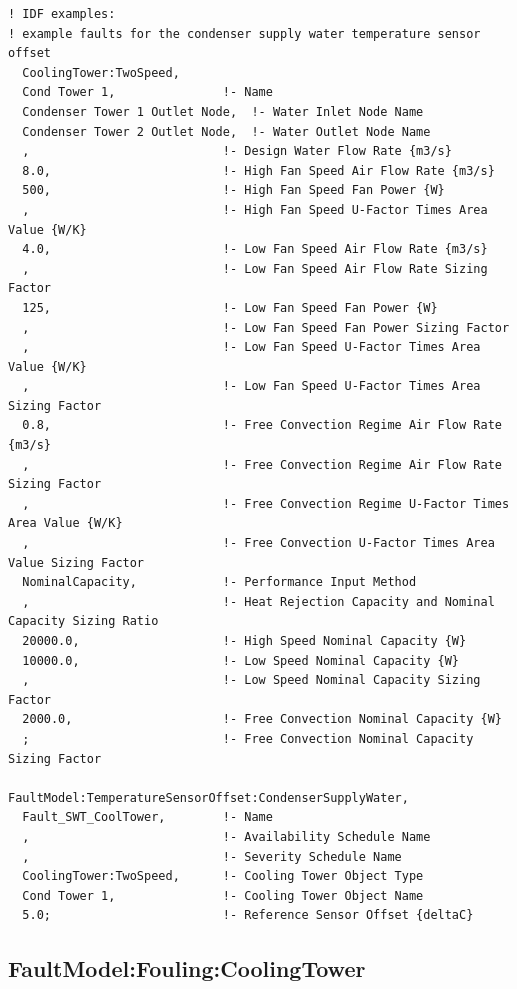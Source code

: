\begin{lstlisting}
! IDF examples:
! example faults for the condenser supply water temperature sensor offset
  CoolingTower:TwoSpeed,
  Cond Tower 1,               !- Name
  Condenser Tower 1 Outlet Node,  !- Water Inlet Node Name
  Condenser Tower 2 Outlet Node,  !- Water Outlet Node Name
  ,                           !- Design Water Flow Rate {m3/s}
  8.0,                        !- High Fan Speed Air Flow Rate {m3/s}
  500,                        !- High Fan Speed Fan Power {W}
  ,                           !- High Fan Speed U-Factor Times Area Value {W/K}
  4.0,                        !- Low Fan Speed Air Flow Rate {m3/s}
  ,                           !- Low Fan Speed Air Flow Rate Sizing Factor
  125,                        !- Low Fan Speed Fan Power {W}
  ,                           !- Low Fan Speed Fan Power Sizing Factor
  ,                           !- Low Fan Speed U-Factor Times Area Value {W/K}
  ,                           !- Low Fan Speed U-Factor Times Area Sizing Factor
  0.8,                        !- Free Convection Regime Air Flow Rate {m3/s}
  ,                           !- Free Convection Regime Air Flow Rate Sizing Factor
  ,                           !- Free Convection Regime U-Factor Times Area Value {W/K}
  ,                           !- Free Convection U-Factor Times Area Value Sizing Factor
  NominalCapacity,            !- Performance Input Method
  ,                           !- Heat Rejection Capacity and Nominal Capacity Sizing Ratio
  20000.0,                    !- High Speed Nominal Capacity {W}
  10000.0,                    !- Low Speed Nominal Capacity {W}
  ,                           !- Low Speed Nominal Capacity Sizing Factor
  2000.0,                     !- Free Convection Nominal Capacity {W}
  ;                           !- Free Convection Nominal Capacity Sizing Factor

FaultModel:TemperatureSensorOffset:CondenserSupplyWater,
  Fault_SWT_CoolTower,        !- Name
  ,                           !- Availability Schedule Name
  ,                           !- Severity Schedule Name
  CoolingTower:TwoSpeed,      !- Cooling Tower Object Type
  Cond Tower 1,               !- Cooling Tower Object Name
  5.0;                        !- Reference Sensor Offset {deltaC}
\end{lstlisting}


\subsection{FaultModel:Fouling:CoolingTower}\label{faultmodelfoulingcoolingtower}

